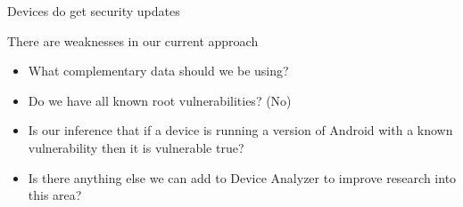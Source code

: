 \documentclass{beamer}
\begin{document}
\begin{frame}{Devices do get security updates}{}
 \begin{center}
  \vspace{-0.5em}
 \end{center}
\end{frame}

\begin{frame}{There are weaknesses in our current approach}{}
 \begin{itemize}
  \item What complementary data should we be using?
  \item Do we have all known root vulnerabilities? (No)
  \item Is our inference that if a device is running a version of Android with a known vulnerability then it is vulnerable true?
  \item Is there anything else we can add to Device Analyzer to improve research into this area?
 \end{itemize}
\end{frame}
\end{document}
